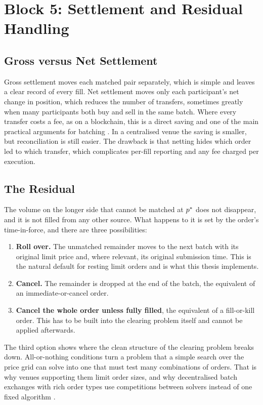 \section{Block 5: Settlement and Residual Handling}
\label{sec:settlement}

\subsection{Gross versus Net Settlement}

Gross settlement moves each matched pair separately, which is simple and
leaves a clear record of every fill. Net settlement moves only each
participant's net change in position, which reduces the number of transfers,
sometimes greatly when many participants both buy and sell in the same batch.
Where every transfer costs a fee, as on a blockchain, this is a direct saving
and one of the main practical arguments for batching
\citep{wang2018loopring,gong2023fbadex}. In a centralised venue the saving is
smaller, but reconciliation is still easier. The drawback is that netting
hides which order led to which transfer, which complicates per-fill reporting
and any fee charged per execution.

\subsection{The Residual}

The volume on the longer side that cannot be matched at $p^{\ast}$ does not
disappear, and it is not filled from any other source. What happens to it is
set by the order's time-in-force, and there are three possibilities:

\begin{enumerate}
  \item \textbf{Roll over.} The unmatched remainder moves to the next batch
  with its original limit price and, where relevant, its original submission
  time. This is the natural default for resting limit orders and is what this
  thesis implements.
  \item \textbf{Cancel.} The remainder is dropped at the end of the batch, the
  equivalent of an immediate-or-cancel order.
  \item \textbf{Cancel the whole order unless fully filled}, the equivalent of a
  fill-or-kill order. This has to be built into the clearing problem itself
  and cannot be applied afterwards.
\end{enumerate}

The third option shows where the clean structure of the clearing problem
breaks down. All-or-nothing conditions turn a problem that a simple search
over the price grid can solve into one that must test many combinations of
orders. That is why venues supporting them limit order sizes, and why
decentralised batch exchanges with rich order types use competitions between
solvers instead of one fixed algorithm \citep{harrison2025hybrid}.

